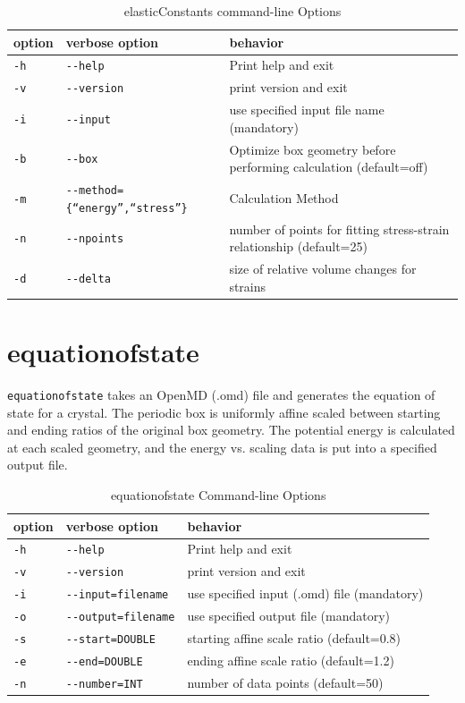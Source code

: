 \documentclass[letterpaper]{report}
\begin{document}
\begin{longtable}[c]{|EFG|}
\caption{elasticConstants command-line Options}
\\ \hline
{\bf option} & {\bf verbose option} & {\bf behavior} \\ \hline
\endhead
\hline
\endfoot
{\tt -h} & {\tt -{}-help}               & Print help and exit\\
{\tt -v} & {\tt -{}-version}          & print version and exit \\
{\tt -i} & {\tt -{}-input}        & use specified input file name
                               (mandatory) \\
{\tt -b} & {\tt -{}-box}          &  Optimize box geometry before performing calculation
                         (default=off) \\
{\tt -m} & {\tt -{}-method=\{``energy'',``stress''\}} & Calculation Method \\
{\tt -n} & {\tt -{}-npoints} &   number of points for fitting
                         stress-strain relationship  (default=25) \\
{\tt -d} & {\tt -{}-delta}  & size of relative volume changes for strains
\end{longtable}


\section{equationofstate}

{\tt equationofstate} takes an OpenMD (.omd) file and generates the
equation of state for a crystal. The periodic box is uniformly affine
scaled between starting and ending ratios of the original box
geometry. The potential energy is calculated at each scaled geometry,
and the energy vs. scaling data is put into a specified output file.

\begin{longtable}[c]{|EFG|}
\caption{equationofstate Command-line Options}
\\ \hline
{\bf option} & {\bf verbose option} & {\bf behavior} \\ \hline
\endhead
\hline
\endfoot
{\tt -h} & {\tt -{}-help}               & Print help and exit\\
{\tt -v} & {\tt -{}-version}          & print version and exit \\
{\tt -i} & {\tt -{}-input=filename}        & use specified input (.omd) file 
                                     (mandatory) \\
{\tt -o} & {\tt -{}-output=filename}        & use specified output file
                                              (mandatory) \\
{\tt -s} & {\tt -{}-start=DOUBLE}    & starting affine scale ratio
                                       (default=0.8) \\
{\tt -e} & {\tt -{}-end=DOUBLE}      & ending affine scale ratio
                                       (default=1.2) \\
{\tt -n} & {\tt -{}-number=INT}      & number of data points
                                       (default=50) 
\end{longtable}
\end{document}

